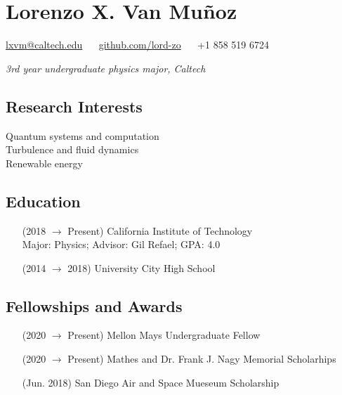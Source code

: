 \documentclass{article}
\begin{document}
{\centering

\section*{Lorenzo X. Van Muñoz}

\href{mailto:lxvm@caltech.edu}{lxvm@caltech.edu}
$\quad$
\href{https://github.com/lord-zo}{github.com/lord-zo}
$\quad$
+1 858 519 6724

\noindent \textit{3rd year undergraduate physics major, Caltech}

}


\begin{multicols}{2}

\subsection*{Research Interests}

\noindent Quantum systems and computation \\
\noindent Turbulence and fluid dynamics \\
\noindent Renewable energy


\subsection*{Education}

\begin{enumerate}
    \item [(2018 $\to$ Present)] California Institute of Technology \\
        Major: Physics; Advisor: Gil Refael; GPA: 4.0
    \item [(2014 $\to$ 2018)] University City High School
\end{enumerate}

\end{multicols}


\subsection*{Fellowships and Awards}

\begin{enumerate}
    \item [(2020 $\to$ Present)] Mellon Mays Undergraduate Fellow
    \item [(2020 $\to$ Present)] Mathes and Dr. Frank J. Nagy Memorial Scholarhips
    \item [(Jun. 2018)] San Diego Air and Space Mueseum Scholarship
\end{enumerate}
\end{document}
